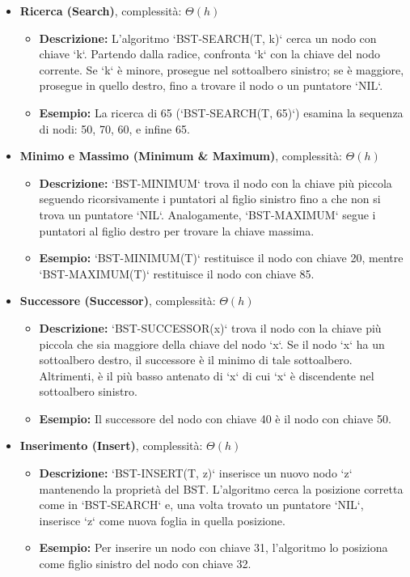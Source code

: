 \begin{itemize}
    \item \textbf{Ricerca (Search)}, complessità: $\Theta(h)$
    \begin{itemize}
        \item \textbf{Descrizione:} L'algoritmo `BST-SEARCH(T, k)` cerca un nodo con chiave `k`. Partendo dalla radice, confronta `k` con la chiave del nodo corrente. Se `k` è minore, prosegue nel sottoalbero sinistro; se è maggiore, prosegue in quello destro, fino a trovare il nodo o un puntatore `NIL`.
        \item \textbf{Esempio:} La ricerca di 65 (`BST-SEARCH(T, 65)`) esamina la sequenza di nodi: 50, 70, 60, e infine 65.
    \end{itemize}

    \item \textbf{Minimo e Massimo (Minimum \& Maximum)}, complessità: $\Theta(h)$
    \begin{itemize}
        \item \textbf{Descrizione:} `BST-MINIMUM` trova il nodo con la chiave più piccola seguendo ricorsivamente i puntatori al figlio sinistro fino a che non si trova un puntatore `NIL`. Analogamente, `BST-MAXIMUM` segue i puntatori al figlio destro per trovare la chiave massima.
        \item \textbf{Esempio:} `BST-MINIMUM(T)` restituisce il nodo con chiave 20, mentre `BST-MAXIMUM(T)` restituisce il nodo con chiave 85.
    \end{itemize}
    
    \item \textbf{Successore (Successor)}, complessità: $\Theta(h)$
    \begin{itemize}
        \item \textbf{Descrizione:} `BST-SUCCESSOR(x)` trova il nodo con la chiave più piccola che sia maggiore della chiave del nodo `x`. Se il nodo `x` ha un sottoalbero destro, il successore è il minimo di tale sottoalbero. Altrimenti, è il più basso antenato di `x` di cui `x` è discendente nel sottoalbero sinistro.
        \item \textbf{Esempio:} Il successore del nodo con chiave 40 è il nodo con chiave 50.
    \end{itemize}

    \item \textbf{Inserimento (Insert)}, complessità: $\Theta(h)$
    \begin{itemize}
        \item \textbf{Descrizione:} `BST-INSERT(T, z)` inserisce un nuovo nodo `z` mantenendo la proprietà del BST. L'algoritmo cerca la posizione corretta come in `BST-SEARCH` e, una volta trovato un puntatore `NIL`, inserisce `z` come nuova foglia in quella posizione.
        \item \textbf{Esempio:} Per inserire un nodo con chiave 31, l'algoritmo lo posiziona come figlio sinistro del nodo con chiave 32.
    \end{itemize}


\end{itemize}
